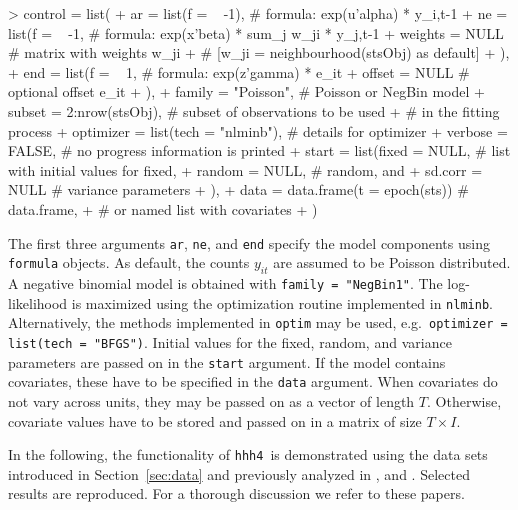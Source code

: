 \documentclass[a4paper,11pt]{article}
\newcommand{\code}[1]{\texttt{#1}}
\newcommand{\hhh}{\texttt{hhh4}}
\begin{document}
\begin{Schunk}
\begin{Sinput}
> control = list(
+     ar = list(f = ~ -1),       # formula: exp(u'alpha) * y_i,t-1 
+     ne = list(f = ~ -1,        # formula: exp(x'beta) * sum_j {w_ji * y_j,t-1} 
+               weights = NULL   # matrix with weights w_ji 
+                                # [w_ji = neighbourhood(stsObj) as default]
+               ),              
+     end = list(f = ~ 1,        # formula:  exp(z'gamma) * e_it 
+               offset = NULL    # optional offset e_it 
+               ),
+     family = "Poisson",                # Poisson or NegBin model
+     subset = 2:nrow(stsObj),           # subset of observations to be used 
+                                        # in the fitting process
+     optimizer = list(tech = "nlminb"), # details for optimizer 
+     verbose = FALSE,                   # no progress information is printed
+     start = list(fixed = NULL,         # list with initial values for fixed,
+                  random = NULL,        # random, and
+                  sd.corr = NULL        # variance parameters
+                  ),
+     data = data.frame(t = epoch(sts))  # data.frame,
+                                        # or named list with covariates 
+     )
\end{Sinput}
\end{Schunk}
The first three arguments \code{ar}, \code{ne}, and \code{end} 
specify the model components using \code{formula} objects.
As default, the counts $y_{it}$ are assumed to be Poisson distributed.
A negative binomial model is obtained with \code{family = "NegBin1"}.
The log-likelihood is maximized using the optimization routine implemented
in \code{nlminb}. Alternatively, the methods implemented in
\code{optim} may be used, e.g.\ \code{optimizer = list(tech = "BFGS")}.
Initial values for the fixed, random, and variance parameters 
are passed on in the \code{start} argument.
If the model contains covariates, these have to be specified in the \code{data} 
argument. When covariates do not vary across units, they may be passed on as a 
vector of length $T$. Otherwise, covariate values have to be stored and passed on
in a matrix of size $T \times I$.


In the following, the functionality of \hhh\ is demonstrated using
the data sets introduced in Section~\ref{sec:data}
and previously analyzed in \cite{paul-etal-2008}, \cite{paul-held-2010} and 
\cite{herzog-etal-2010}.
Selected results are reproduced. For a thorough discussion 
we refer to these papers.
\end{document}
